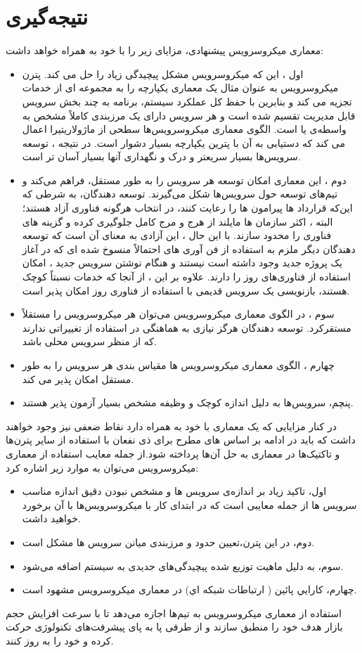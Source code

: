 \section{نتیجه‌گیری}
معماری میکرو‌سرویس پیشنهادی، مزایای زیر را با خود به همراه خواهد داشت:
\begin{itemize}
\item
اول ، این که میکرو‌سرویس مشکل پیچیدگی زیاد را حل می کند. پترن میکروسرویس به عنوان مثال یک معماری یکپارچه را به مجموعه ای از خدمات تجزیه می کند و بنابرین با حفظ  کل عملکرد سیستم، برنامه به چند بخش سرویس قابل مدیریت تقسیم شده است و هر سرویس دارای یک مرزبندی کاملاً  مشخص به واسطه‌ی  یا  است. الگوی معماری میکروسرویس‌ها سطحی از ماژولاریتیرا اعمال می کند که دستیابی به آن با پترین یکپارچه بسیار دشوار است. در نتیجه ، توسعه سرویس‌ها بسیار سریعتر و درک و نگهداری آنها بسیار آسان تر است. 
\item
دوم ، این معماری امکان توسعه هر سرویس را به طور مستقل، فراهم می‌کند و تیم‌های توسعه حول سرویس‌ها شکل می‌گیرند. توسعه دهندگان،  به شرطی که این‌که قرارداد ها پیرامون  ها را رعایت کنند، در انتخاب هرگونه فناوری آزاد هستند؛ البته ، اکثر سازمان ها مایلند از هرج و مرج کامل جلوگیری کرده و گزینه های فناوری را محدود سازند. با این حال ، این آزادی به معنای آن است که توسعه دهندگان دیگر ملزم به استفاده از فن آوری های احتمالاً منسوخ شده ای که در آغاز یک پروژه جدید وجود داشته است نیستند و هنگام نوشتن سرویس جدید ، امکان استفاده از فناوری‌‌های روز را دارند. علاوه بر این ، از آنجا که خدمات نسبتاً کوچک هستند، بازنویسی یک سرویس قدیمی با استفاده از فناوری روز امکان پذیر است. 
\item
سوم ، در الگوی معماری میکروسرویس می‌توان هر میکرو‌سرویس را مستقلاً مستقرکرد. توسعه دهندگان هرگز نیازی به هماهنگی در استفاده از تغییراتی ندارند که از منظر سرویس محلی باشد.
\item
چهارم ، الگوی معماری میکروسرویس ها مقیاس بندی هر سرویس را به طور مستقل امکان پذیر می کند. 
\item
پنچم، سرویس‌ها به دلیل اندازه کوچک و وظیفه مشخص بسیار آزمون پذیر هستند. 
\end{itemize}
در کنار مزایایی که یک معماری با خود به همراه دارد نقاط ضعفی نیز وجود خواهند داشت که باید در ادامه بر اساس  های مطرح برای ذی نفعان با استفاده از سایر پترن‌ها و تاکتیک‌ها در معماری به حل آن‌ها پرداخته شود.از جمله معایب استفاده از معماری میکروسرویس می‌توان به موارد زیر اشاره کرد:
\begin{itemize}
\item
اول، تاکید زیاد بر اندازه‌ی سرویس ها و مشخص نبودن دقیق اندازه مناسب سرویس ها از جمله معایبی است که در ابتدای کار با میکروسرویس‌ها با آن برخورد خواهید داشت.
\item
دوم، در این پترن،تعيين حدود و مرزبندی میانن سرويس ها مشكل است. 
\item
سوم، به دلیل ماهیت توزیع شده پیچیدگی‌های جدیدی به سیستم اضافه می‌شود.
\item
چهارم، كارايي پائين ( ارتباطات شبكه اي) در معماری میکروسرویس مشهود است.
\end{itemize}

استفاده از معماری میکروسرویس به تیم‌ها اجازه می‌دهد تا با سرعت افزایش حجم بازار هدف خود را منطبق سازند و از طرفی پا به پای پیشرفت‌های تکنولوژی حرکت کرده و خود را به روز کنند.
